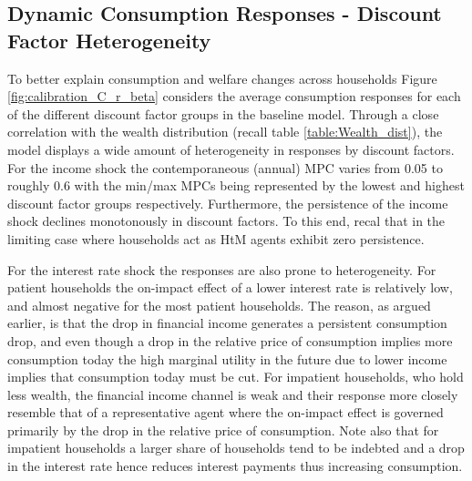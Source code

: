 






\subsection{Dynamic Consumption Responses - Discount Factor Heterogeneity} \label{sec:C_robustness_disc}
To better explain consumption and welfare changes across households Figure \ref{fig:calibration_C_r_beta} considers the average consumption responses for each of the different discount factor groups in the baseline model. Through a close correlation with the wealth distribution (recall table \ref{table:Wealth_dist}), the model displays a wide amount of heterogeneity in responses by discount factors. For the income shock the contemporaneous (annual) MPC varies from 0.05 to roughly 0.6 with the min/max MPCs being represented by the lowest and highest discount factor groups respectively. Furthermore, the persistence of the income shock declines monotonously in discount factors. To this end, recal that in the  limiting case where households act as HtM agents exhibit zero persistence.    

For the interest rate shock the responses are also prone to heterogeneity. For patient households the on-impact effect of a lower interest rate is relatively low, and almost negative for the most patient households. The reason, as argued earlier, is that the drop in financial income generates a persistent consumption drop, and even though a drop in the relative price of consumption implies more consumption today the high marginal utility in the future due to lower income implies that consumption today must be cut. For impatient households, who hold less wealth, the financial income channel is weak and their response more closely resemble that of a representative agent where the on-impact effect is governed primarily by the drop in the relative price of consumption. Note also that for impatient households a larger share of households tend to be indebted and a drop in the interest rate hence reduces interest payments thus increasing consumption.  


